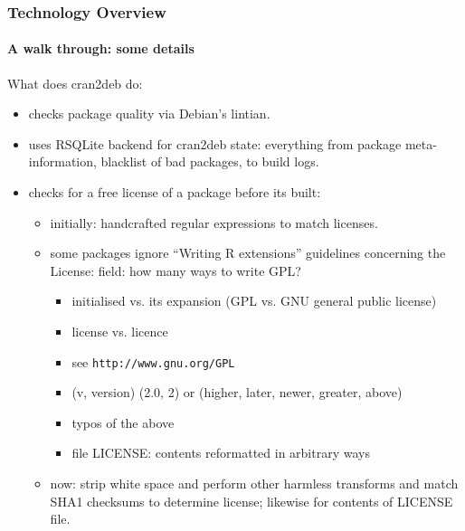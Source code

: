 \documentclass[smaller,compress]{beamer}
\begin{document}
\begin{frame}
  \frametitle{Technology Overview} 
  \framesubtitle{A walk through: some details}

  What does cran2deb do:
  \begin{itemize}
  \item checks package quality via Debian's lintian.
  \item uses RSQLite backend for cran2deb state: everything from package
    meta-information, blacklist of bad packages, to build logs. 
  \item checks for a free license of a package before its built:
    \begin{itemize}
        \item initially: handcrafted regular expressions to match
                licenses.
        \item some packages ignore ``Writing R extensions'' guidelines concerning the License: field: how many ways to write GPL?
            \begin{itemize}
                \item initialised vs. its expansion (GPL vs. GNU general public license)
                \item license vs. licence
                \item see \texttt{http://www.gnu.org/GPL}
                \item (v, version) (2.0, 2) or (higher, later, newer, greater, above)
                \item typos of the above
                \item file LICENSE: contents reformatted in arbitrary ways
            \end{itemize}
        \item now: strip white space and perform other harmless transforms
                and match SHA1 checksums to determine license;  likewise for contents of LICENSE
                file.
    \end{itemize}
  \end{itemize}
\end{frame}  
\end{document}
